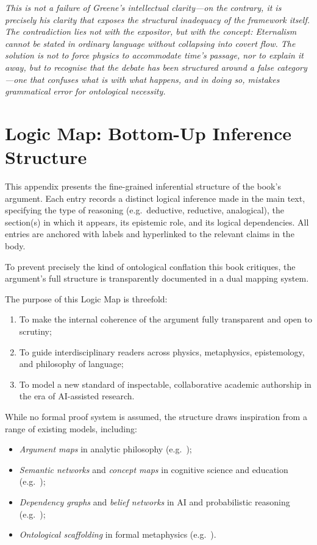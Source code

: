 \documentclass[12pt]{book}
\begin{document}
\textit{This is not a failure of Greene's intellectual clarity---on the contrary, it is precisely his clarity that exposes the structural inadequacy of the framework itself. The contradiction lies not with the expositor, but with the concept: Eternalism cannot be stated in ordinary language without collapsing into covert flow. The solution is not to force physics to accommodate time's passage, nor to explain it away, but to recognise that the debate has been structured around a false category---one that confuses \textit{what is} with \textit{what happens}, and in doing so, mistakes grammatical error for ontological necessity.}

\chapter{Logic Map: Bottom-Up Inference Structure}
\label{appendix:logicmap-bottomup}

This appendix presents the fine-grained inferential structure of the book's argument. Each entry records a distinct logical inference made in the main text, specifying the type of reasoning (e.g.\ deductive, reductive, analogical), the section(s) in which it appears, its epistemic role, and its logical dependencies. All entries are anchored with labels and hyperlinked to the relevant claims in the body.

To prevent precisely the kind of ontological conflation this book critiques, the argument's full structure is transparently documented in a dual mapping system.

The purpose of this Logic Map is threefold:
\begin{enumerate}
  \item To make the internal coherence of the argument fully transparent and open to scrutiny;
  \item To guide interdisciplinary readers across physics, metaphysics, epistemology, and philosophy of language;
  \item To model a new standard of inspectable, collaborative academic authorship in the era of AI-assisted research.
\end{enumerate}

While no formal proof system is assumed, the structure draws inspiration from a range of existing models, including:
\begin{itemize}
  \item \textit{Argument maps} in analytic philosophy (e.g.\ \cite{harrell2011});
  \item \textit{Semantic networks} and \textit{concept maps} in cognitive science and education (e.g.\ \cite{novak1998learning});
  \item \textit{Dependency graphs} and \textit{belief networks} in AI and probabilistic reasoning (e.g.\ \cite{pearl1988});
  \item \textit{Ontological scaffolding} in formal metaphysics (e.g.\ \cite{smith1998}).
\end{itemize}
\end{document}
